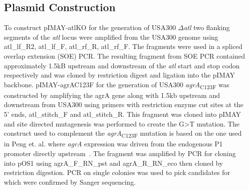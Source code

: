 \documentclass[10pt,letterpaper]{article}
\begin{document}
\subsection*{Plasmid Construction}
To construct pIMAY-atlKO for the generation of USA300 $\Delta$\textit{atl} two flanking segments of the \textit{atl} locus were amplified from the USA300 genome using atl\_lf\_R2, atl\_lf\_F, atl\_rf\_R, atl\_rf\_F.
The fragments were used in a spliced overlap extension (SOE) PCR.
The resulting fragment from SOE PCR contained approximately 1.5kB upstream and downstream of the \textit{atl} start and stop codon respectively and was cloned by restriction digest and ligation into the pIMAY backbone.
pIMAY-agrAC123F for the generation of USA300 \textit{agrA}\textsubscript{C123F} was constructed by amplifying the agrA gene along with 1.5kb upstream and downstream from USA300 using primers with restriction enzyme cut sites at the 5' ends, atl\_stitch\_F and atl\_stitch\_R.
This fragment was cloned into pIMAY and site directed mutagenesis was performed to create the G>T mutation.
The construct used to complement the \textit{agrA}\textsubscript{C123F} mutation is based on the one used in Peng et. al. where \textit{agrA} expression was driven from the endogenous P1 promoter directly upstream~\cite{peng_cloning_1988}.
The fragment was amplified by PCR for cloning into pOS1 using agrA\_F\_RN\_pst and agrA\_R\_RN\_eco then cloned by restriction digestion.
PCR on single colonies was used to pick candidates for which were confirmed by Sanger sequencing.
\end{document}
